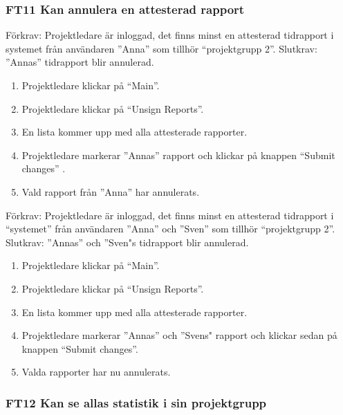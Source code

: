 \documentclass[paper=a4, fontsize=11pt,twoside]{article}
\begin{document}
		\subsubsection*{FT11 Kan annulera en attesterad rapport}
		
		Förkrav: Projektledare är inloggad, det finns minst en attesterad tidrapport i
		systemet från användaren  ”Anna” som tillhör “projektgrupp 2”.
		\newline
		Slutkrav: ”Annas” tidrapport blir annulerad.
		
		\begin{enumerate}
		  \item Projektledare klickar på “Main”.
		  \item Projektledare klickar på “Unsign Reports”.
		  \item En lista kommer upp med alla attesterade rapporter.
		  \item Projektledare markerar ”Annas” rapport och klickar på knappen “Submit
		  changes” .
		  \item Vald rapport från ”Anna” har annulerats.
		  
		\end{enumerate}
		
		Förkrav: Projektledare är inloggad, det finns minst en attesterad tidrapport i
		“systemet” från användaren  ”Anna” och ”Sven” som tillhör “projektgrupp 2”.
		\newline
		Slutkrav: ”Annas” och ”Sven"s tidrapport blir annulerad.
		
		\begin{enumerate}
		 \item Projektledare klickar på “Main”.
		 \item Projektledare klickar på “Unsign Reports”.
		 \item En lista kommer upp med alla attesterade rapporter.
		 \item Projektledare markerar ”Annas” och ”Svens" rapport och klickar sedan på
		 knappen “Submit changes”.
		  \item Valda rapporter har nu annulerats.
		  
		\end{enumerate}
		
		\subsubsection*{FT12 Kan se allas statistik i sin projektgrupp}
		
\end{document}
